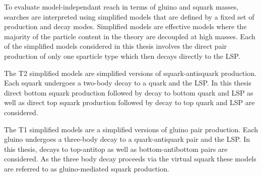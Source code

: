 To evaluate model-independant reach in terms of gluino and squark masses, searches are interpreted using 
simplified models that are defined by a fixed set of production and decay modes.
Simplified models are effective models where the majority of the particle content in the theory 
are decoupled at high masses. Each of the simplified models considered in this thesis involves
the direct pair production of only one sparticle type which then decays directly to the LSP.

The T2 simplified models are simplified versions of squark-antisquark production. Each squark undergoes
a two-body decay to a quark and the LSP. In this thesis direct bottom squark production followed
by decay to bottom quark and LSP as well as direct top squark production followed by decay to top
quark and LSP are considered.

The T1 simplified models are a simplified versions of gluino pair production. Each gluino undergoes a three-body 
decay to a quark-antiquark pair and the LSP. In this thesis, decays to top-antitop as well as bottom-antibottom
pairs are considered. As the three body decay proceeds via the virtual squark these models 
are referred to as gluino-mediated squark production.

